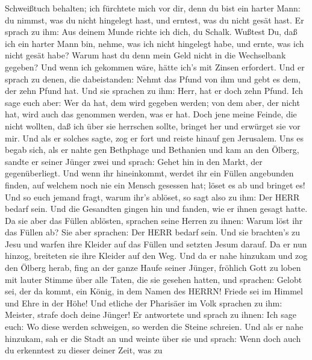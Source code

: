 Schweißtuch behalten;  ich fürchtete mich vor dir, denn du
bist ein harter Mann: du nimmst, was du nicht hingelegt hast, und
erntest, was du nicht gesät hast.  Er sprach zu ihm: Aus
deinem Munde richte ich dich, du Schalk. Wußtest Du, daß ich ein harter
Mann bin, nehme, was ich nicht hingelegt habe, und ernte, was ich nicht
gesät habe?  Warum hast du denn mein Geld nicht in die
Wechselbank gegeben? Und wenn ich gekommen wäre, hätte ich's mit Zinsen
erfordert.  Und er sprach zu denen, die dabeistanden: Nehmt
das Pfund von ihm und gebt es dem, der zehn Pfund hat.  Und
sie sprachen zu ihm: Herr, hat er doch zehn Pfund.  Ich
sage euch aber: Wer da hat, dem wird gegeben werden; von dem aber, der
nicht hat, wird auch das genommen werden, was er hat.  Doch
jene meine Feinde, die nicht wollten, daß ich über sie herrschen sollte,
bringet her und erwürget sie vor mir.  Und als er solches
sagte, zog er fort und reiste hinauf gen Jerusalem.  Uns es
begab sich, als er nahte gen Bethphage und Bethanien und kam an den
Ölberg, sandte er seiner Jünger zwei  und sprach: Gehet hin
in den Markt, der gegenüberliegt. Und wenn ihr hineinkommt, werdet ihr
ein Füllen angebunden finden, auf welchem noch nie ein Mensch gesessen
hat; löset es ab und bringet es!  Und so euch jemand fragt,
warum ihr's ablöset, so sagt also zu ihm: Der HERR bedarf sein.
 Und die Gesandten gingen hin und fanden, wie er ihnen
gesagt hatte.  Da sie aber das Füllen ablösten, sprachen
seine Herren zu ihnen: Warum löst ihr das Füllen ab?  Sie
aber sprachen: Der HERR bedarf sein.  Und sie brachten's zu
Jesu und warfen ihre Kleider auf das Füllen und setzten Jesum darauf.
 Da er nun hinzog, breiteten sie ihre Kleider auf den Weg.
 Und da er nahe hinzukam und zog den Ölberg herab, fing an
der ganze Haufe seiner Jünger, fröhlich Gott zu loben mit lauter Stimme
über alle Taten, die sie gesehen hatten,  und sprachen:
Gelobt sei, der da kommt, ein König, in dem Namen des HERRN! Friede sei
im Himmel und Ehre in der Höhe!  Und etliche der Pharisäer
im Volk sprachen zu ihm: Meister, strafe doch deine Jünger!
 Er antwortete und sprach zu ihnen: Ich sage euch: Wo diese
werden schweigen, so werden die Steine schreien.  Und als
er nahe hinzukam, sah er die Stadt an und weinte über sie 
und sprach: Wenn doch auch du erkenntest zu dieser deiner Zeit, was zu
